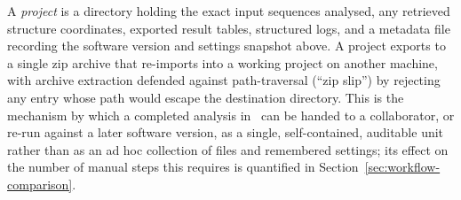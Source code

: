 A \emph{project} is a directory holding the exact input sequences analysed,
any retrieved structure coordinates, exported result tables, structured logs,
and a metadata file recording the software version and settings snapshot
above. A project exports to a single zip archive that re-imports into a
working project on another machine, with archive extraction defended against
path-traversal (``zip slip'') by rejecting any entry whose path would
escape the destination directory. This is the mechanism by which a
completed analysis in \bsi\ can be handed to a collaborator, or re-run
against a later software version, as a single, self-contained, auditable
unit rather than as an ad hoc collection of files and remembered settings;
its effect on the number of manual steps this requires is quantified in
Section~\ref{sec:workflow-comparison}.
